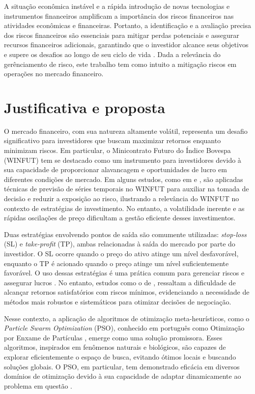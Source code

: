 \documentclass{iftex2024}
\begin{document}
A situação econômica instável e a rápida introdução de novas
tecnologias e instrumentos financeiros amplificam a importância dos riscos financeiros
nas atividades econômicas e financeiras. Portanto, a identificação e a avaliação precisa
dos riscos financeiros são essenciais para mitigar perdas potenciais e assegurar recursos
financeiros adicionais, garantindo que o investidor alcance seus objetivos e supere os
desafios ao longo de seu ciclo de vida \cite{Pakhucha_Sievidova_Siadrysta_Mohilevsky_Oliynik_Bogdanovych_2021}. Dada a relevância do
gerênciamento de risco, este trabalho tem como intuito a mitigação riscos em operações
no mercado financeiro.

\section{Justificativa e proposta}

O mercado financeiro, com sua natureza altamente volátil, representa um desafio
significativo para investidores que buscam maximizar retornos enquanto minimizam riscos.
Em particular, o Minicontrato Futuro do Índice Bovespa (WINFUT) tem se destacado
como um instrumento para investidores devido à sua capacidade de proporcionar
alavancagem e oportunidades de lucro em diferentes condições de mercado. Em alguns
estudos, como em \textcite{bovespa1} e \textcite{bovespa2}, são aplicadas técnicas de 
previsão de séries temporais no WINFUT para auxiliar na tomada de decisão e reduzir a exposição ao risco,
ilustrando a relevância do WINFUT no contexto de estratégias de investimento. No
entanto, a volatilidade inerente e as rápidas oscilações de preço dificultam a gestão eficiente
desses investimentos.

Duas estratégias envolvendo pontos de saída são comumente utilizadas: \textit{stop-loss} (SL) e \textit{take-profit} (TP), 
ambas relacionadas à saída do mercado por parte do investidor. O SL ocorre quando o preço do ativo atinge um nível 
desfavorável, enquanto o TP é acionado quando o preço atinge um nível suficientemente favorável.
O uso dessas estratégias é uma prática comum para gerenciar riscos e assegurar lucros \cite{WOS:000231777300003}. 
No entanto, estudos como o de \textcite{Santos_Silva_Villagrán_Ribeiro_Sanfins_2021}, ressaltam a dificuldade de alcançar retornos satisfatórios com
riscos mínimos, evidenciando a necessidade de métodos mais robustos e sistemáticos para
otimizar decisões de negociação.

Nesse contexto, a aplicação de algoritmos de otimização meta-heurísticos, como
o \textit{Particle Swarm Optimization} (PSO), conhecido em português como Otimização por Enxame de Partículas \cite{488968}, emerge como uma solução promissora.
Esses algoritmos, inspirados em fenômenos naturais e biológicos, são capazes de explorar
eficientemente o espaço de busca, evitando ótimos locais e buscando soluções globais. O
PSO, em particular, tem demonstrado eficácia em diversos domínios de otimização devido
à sua capacidade de adaptar dinamicamente ao problema em questão \cite{PSO25ANOS}.
\end{document}
